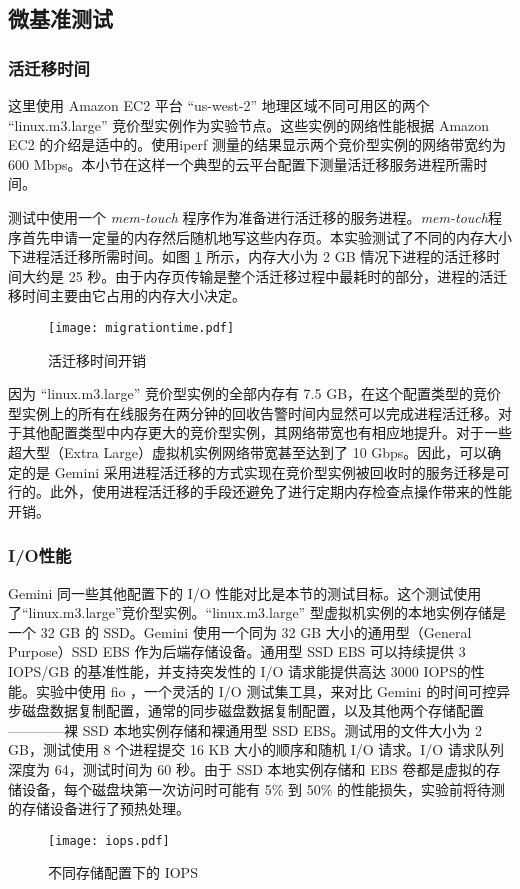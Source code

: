 \subsection{微基准测试}

\subsubsection{活迁移时间}
\label{gemini-migrationtime}
这里使用 Amazon EC2 平台 ``us-west-2'' 地理区域不同可用区的两个 ``linux.m3.large'' 竞价型实例作为实验节点。这些实例的网络性能根据 Amazon EC2 的介绍是适中的。使用iperf \cite{Iperf:2014} 测量的结果显示两个竞价型实例的网络带宽约为 600 Mbps。本小节在这样一个典型的云平台配置下测量活迁移服务进程所需时间。

测试中使用一个 \emph{mem-touch} 程序作为准备进行活迁移的服务进程。\emph{mem-touch}程序首先申请一定量的内存然后随机地写这些内存页。本实验测试了不同的内存大小下进程活迁移所需时间。如图 \ref{figure:migrationtime} 所示，内存大小为 2 GB 情况下进程的活迁移时间大约是 25 秒。由于内存页传输是整个活迁移过程中最耗时的部分，进程的活迁移时间主要由它占用的内存大小决定。
\begin{figure}
  \centering
  \texttt{[image: migrationtime.pdf]}
  \caption{活迁移时间开销}
  \label{figure:migrationtime}
\end{figure}

因为 ``linux.m3.large'' 竞价型实例的全部内存有 7.5 GB，在这个配置类型的竞价型实例上的所有在线服务在两分钟的回收告警时间内显然可以完成进程活迁移。对于其他配置类型中内存更大的竞价型实例，其网络带宽也有相应地提升。对于一些超大型（Extra Large）虚拟机实例网络带宽甚至达到了 10 Gbps。因此，可以确定的是 Gemini 采用进程活迁移的方式实现在竞价型实例被回收时的服务迁移是可行的。此外，使用进程活迁移的手段还避免了进行定期内存检查点操作带来的性能开销。

\subsubsection{I/O性能}
Gemini 同一些其他配置下的 I/O 性能对比是本节的测试目标。这个测试使用了``linux.m3.large''竞价型实例。``linux.m3.large'' 型虚拟机实例的本地实例存储是一个 32 GB 的 SSD。Gemini 使用一个同为 32 GB 大小的通用型（General Purpose）SSD EBS 作为后端存储设备。通用型 SSD EBS 可以持续提供 3 IOPS/GB 的基准性能，并支持突发性的 I/O 请求能提供高达 3000 IOPS的性能。实验中使用 fio \cite{FIO:2014}，一个灵活的 I/O 测试集工具，来对比 Gemini 的时间可控异步磁盘数据复制配置，通常的同步磁盘数据复制配置，以及其他两个存储配置————裸 SSD 本地实例存储和裸通用型 SSD EBS。测试用的文件大小为 2 GB，测试使用 8 个进程提交 16 KB 大小的顺序和随机 I/O 请求。I/O 请求队列深度为 64，测试时间为 60 秒。由于 SSD 本地实例存储和 EBS 卷都是虚拟的存储设备，每个磁盘块第一次访问时可能有 5\% 到 50\% 的性能损失，实验前将待测的存储设备进行了预热处理。
\begin{figure}[]
  \centering
  \texttt{[image: iops.pdf]}
  \caption{不同存储配置下的 IOPS}
  \label{figure:iops}
\end{figure}

